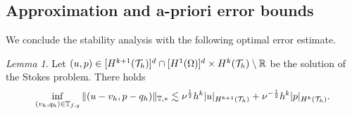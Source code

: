 \documentclass[pdflatex,sn-mathphys,Numbered]{sn-jnl}%
\theoremstyle{remark}%
\newtheorem{lemma}[theorem]{Lemma}
\theoremstyle{definition}%
\begin{document}
\subsection{Approximation and a-priori error bounds}

We conclude the stability analysis with the following optimal error estimate. 
\begin{lemma}
Let $(u,p) \in [H^{k+1}({\mathcal{T}_h})]^d\cap [H^1(\Omega)]^d \times H^{k}({\mathcal{T}_h})
\setminus \mathbb{R}$ be the solution of the Stokes problem.
  There holds
  \begin{equation} \label{eq:approx}
    \inf_{(v_h,q_h) \in \mathbb{T}_{f,g}} \Vert (u-v_h,p-q_h) \Vert_{\mathbb{T},\ast} \lesssim
    \nu^{\frac12} h^{k} \vert  u \vert_{H^{k+1}({\mathcal{T}_h})} + \nu^{-\frac12} h^{k} \vert p \vert_{H^{k}({\mathcal{T}_h})}.
  \end{equation}
\end{lemma}
\end{document}
